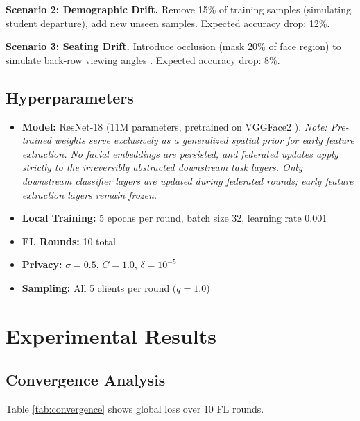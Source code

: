 \documentclass[conference]{IEEEtran}
\begin{document}
\textbf{Scenario 2: Demographic Drift.} Remove 15\% of training samples (simulating student departure), add new unseen samples. Expected accuracy drop: 12\%.

\textbf{Scenario 3: Seating Drift.} Introduce occlusion (mask 20\% of face region) to simulate back-row viewing angles \cite{b27}. Expected accuracy drop: 8\%.

\subsection{Hyperparameters}

\begin{itemize}
    \item \textbf{Model:} ResNet-18 (11M parameters, pretrained on VGGFace2 \cite{b28}). \textit{Note: Pre-trained weights serve exclusively as a generalized spatial prior for early feature extraction. No facial embeddings are persisted, and federated updates apply strictly to the irreversibly abstracted downstream task layers. Only downstream classifier layers are updated during federated rounds; early feature extraction layers remain frozen.}
    \item \textbf{Local Training:} 5 epochs per round, batch size 32, learning rate 0.001
    \item \textbf{FL Rounds:} 10 total
    \item \textbf{Privacy:} $\sigma=0.5$, $C=1.0$, $\delta=10^{-5}$
    \item \textbf{Sampling:} All 5 clients per round ($q=1.0$)
\end{itemize}

\section{Experimental Results}

\subsection{Convergence Analysis}

Table \ref{tab:convergence} shows global loss over 10 FL rounds.
\end{document}
